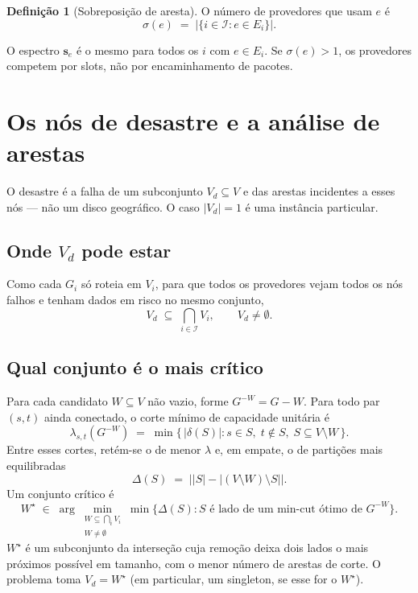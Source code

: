 \documentclass[11pt,a4paper]{article}
\theoremstyle{definition}
\newtheorem{definicao}{Definição}
\begin{document}
\begin{definicao}[Sobreposição de aresta]
O número de provedores que usam $e$ é
\begin{equation}
  \sigma(e)
  \;=\;
  \bigl|\{i\in\mathcal{I}: e\in E_i\}\bigr|.
\end{equation}
\end{definicao}

O espectro $\mathbf{s}_e$ é o mesmo para todos os $i$ com $e\in E_i$.
Se $\sigma(e)>1$, os provedores competem por slots, não por encaminhamento de pacotes.

\section{Os nós de desastre e a análise de arestas}

O desastre é a falha de um subconjunto $V_d\subseteq V$ e das arestas incidentes a esses nós --- não um disco geográfico.
O caso $|V_d|=1$ é uma instância particular.

\subsection{Onde $V_d$ pode estar}

Como cada $G_i$ só roteia em $V_i$, para que todos os provedores vejam todos os nós falhos e tenham dados em risco no mesmo conjunto,
\begin{equation}
  V_d \;\subseteq\; \bigcap_{i\in\mathcal{I}} V_i,
  \qquad
  V_d\neq\emptyset.
\end{equation}

\subsection{Qual conjunto é o mais crítico}

Para cada candidato $W\subseteq V$ não vazio, forme $G^{-W}=G-W$.
Para todo par $(s,t)$ ainda conectado, o corte mínimo de capacidade unitária é
\begin{equation}
  \lambda_{s,t}(G^{-W})
  \;=\;
  \min\bigl\{\,|\delta(S)| : s\in S,\; t\notin S,\; S\subseteq V\setminus W\,\bigr\}.
\end{equation}
Entre esses cortes, retém-se o de menor $\lambda$ e, em empate, o de partições mais equilibradas
\begin{equation}
  \Delta(S)
  \;=\;
  \bigl\lvert |S| - |(V\setminus W)\setminus S| \bigr\rvert.
\end{equation}
Um conjunto crítico é
\begin{equation}
  W^\star
  \;\in\;
  \arg\min_{\substack{W\subseteq\bigcap_i V_i\\ W\neq\emptyset}}
  \min\bigl\{\Delta(S): S\text{ é lado de um min-cut ótimo de }G^{-W}\bigr\}.
\end{equation}
$W^\star$ é um subconjunto da interseção cuja remoção deixa dois lados o mais próximos possível em tamanho, com o menor número de arestas de corte.
O problema toma $V_d=W^\star$ (em particular, um singleton, se esse for o $W^\star$).
\end{document}
